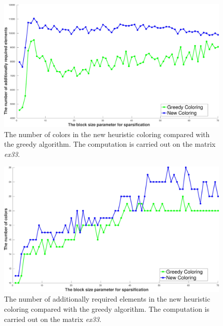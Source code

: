 \documentclass[12pt, twoside]{book}
\begin{document}
\begin{figure}
\centering
\includegraphics[width=0.9\linewidth]{bls_adds_ex33_without_alpha}
\caption{The number of colors in the new heuristic coloring compared with the greedy algorithm.
The computation is carried out on the matrix \textit{ex33}. }
\label{bls_adds_ex33_without_alpha}
\end{figure}

\begin{figure}

\centering
\includegraphics[width=0.9\linewidth]{bls_cols_ex33_without_alpha}
\caption{The number of additionally required elements in the new heuristic coloring compared with the greedy algorithm.
The computation is carried out on the matrix \textit{ex33}. }
\label{bls_cols_ex33_without_alpha}
\end{figure}
\end{document}
